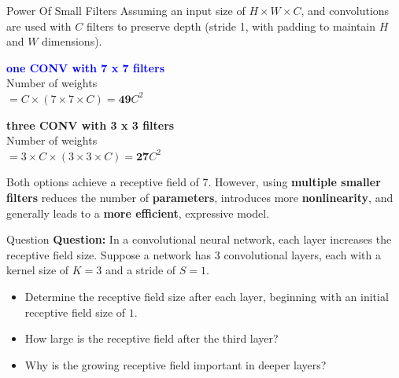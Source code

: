 \documentclass[default, aspectratio=169]{beamer}
\begin{document}
	\begin{frame}{Power Of Small Filters}
		Assuming an input size of  $H \times W \times C$, and convolutions are used with $C$ filters to preserve depth (stride 1, with padding to maintain $H$ and $W$ dimensions).
		
		\bigskip
		\begin{minipage}{0.45\textwidth}
			\textcolor{blue}{\textbf{one CONV with 7 x 7 filters}} \\
			Number of weights \\
			$= C \times (7 \times 7 \times C) = \textbf{49} C^2$
		\end{minipage}
		\hfill
		\begin{minipage}{0.45\textwidth}
			\textbf{three CONV with 3 x 3 filters} \\
			Number of weights \\
			$= 3 \times C \times (3 \times 3 \times C) = \textbf{27} C^2$
		\end{minipage}
		\bigskip
		\begin{flushleft}
			Both options achieve a receptive field of 7. However, using \textbf{multiple smaller filters} reduces the number of \textbf{parameters}, introduces more \textbf{nonlinearity}, and generally leads to a \textbf{more efficient}, expressive model.
		\end{flushleft}
	\end{frame}	
	\begin{frame}{Question}
		\textbf{Question:} In a convolutional neural network, each layer increases the receptive field size. 
		Suppose a network has 3 convolutional layers, each with a kernel size of \( K = 3 \) and a stride of \( S = 1 \).
		\begin{itemize}
			\item Determine the receptive field size after each layer, beginning with an initial receptive field size of \( 1 \).
			\item How large is the receptive field after the third layer?
			\item Why is the growing receptive field important in deeper layers?
		\end{itemize}
	\end{frame}
	
\end{document}
